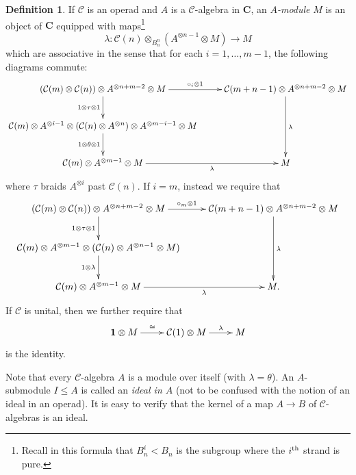 \documentclass[12pt]{article}
\newcommand{\CC} {\mathcal{C}}
\newcommand{\bC} {\mathbf{C}}
\newcommand{\one} {\mathbf{1}}
\newcommand{\nth}{\textsuperscript{th}}
\theoremstyle{plain}
\theoremstyle{definition}
\newtheorem{defn}[thm]{Definition}
\theoremstyle{remark}
\begin{document}
\begin{defn} If $\CC$ is an operad and $A$ is a $\CC$-algebra in $\bC$, an \emph{$A$-module} $M$ is an object of $\bC$ equipped with maps\footnote{Recall in this formula that $B_n^i < B_n$ is the subgroup where the $i\nth$ strand is pure.}
%
$$\lambda: \CC(n) \otimes_{B^n_{n}} (A^{\otimes n-1} \otimes M) \to M$$
%
which are associative in the sense that for each $i =1, \dots, m-1$, the following diagrams commute: 
%
$$\xymatrix{
(\CC(m) \otimes \CC(n)) \otimes A^{\otimes n+m-2} \otimes M \ar[r]^-{\circ_i \otimes 1} \ar[d]_-{1 \otimes \tau \otimes 1} & \CC(m+n-1) \otimes A^{\otimes n+m-2} \otimes M \ar[dd]^-{\lambda} \\ 
\CC(m) \otimes A^{\otimes{i-1}} \otimes (\CC(n) \otimes A^{\otimes n}) \otimes A^{\otimes m-i-1} \otimes M \ar[d]_-{1 \otimes \theta \otimes 1} & \\
\CC(m) \otimes A^{\otimes m-1} \otimes M \ar[r]_-{\lambda} & M
}$$
%
where $\tau$ braids $A^{\otimes i}$ past $\CC(n)$.  If $i=m$, instead we require that 
%
$$\xymatrix{
(\CC(m) \otimes \CC(n)) \otimes A^{\otimes n+m-2} \otimes M \ar[r]^-{\circ_m \otimes 1} \ar[d]_-{1 \otimes \tau \otimes 1} & \CC(m+n-1) \otimes A^{\otimes n+m-2} \otimes M \ar[dd]^-{\lambda} \\ 
\CC(m) \otimes A^{\otimes {m-1}} \otimes (\CC(n) \otimes A^{\otimes n-1} \otimes M) \ar[d]_-{1 \otimes  \lambda} & \\
\CC(m) \otimes A^{\otimes m-1} \otimes M \ar[r]_-{\lambda} & M.
}$$
%
If $\CC$ is unital, then we further require that
%
$$\xymatrix{\one \otimes M \ar[r]^-{\cong} & \CC(1) \otimes M \ar[r]^-{\lambda} & M}$$
% 
is the identity.

\end{defn}

Note that every $\CC$-algebra $A$ is a module over itself (with $\lambda = \theta$).  An $A$-submodule $I \leq A$ is called an \emph{ideal in $A$} (not to be confused with the notion of an ideal in an operad).  It is easy to verify that the kernel of a map $A \to B$ of $\CC$-algebras is an ideal.
\end{document}
